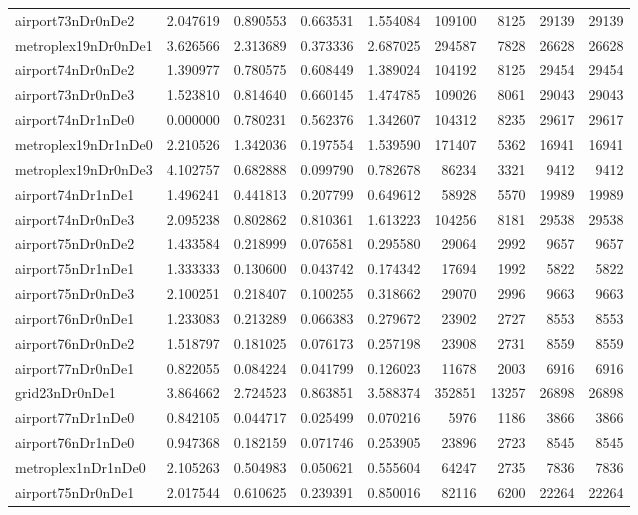 \begin{longtable}{|l|r|r|r|r|r|r|r|r|}
airport73nDr0nDe2 & 2.047619 & 0.890553 & 0.663531 & 1.554084 & 109100 & 8125 & 29139 & 29139 \\
metroplex19nDr0nDe1 & 3.626566 & 2.313689 & 0.373336 & 2.687025 & 294587 & 7828 & 26628 & 26628 \\
airport74nDr0nDe2 & 1.390977 & 0.780575 & 0.608449 & 1.389024 & 104192 & 8125 & 29454 & 29454 \\
airport73nDr0nDe3 & 1.523810 & 0.814640 & 0.660145 & 1.474785 & 109026 & 8061 & 29043 & 29043 \\
airport74nDr1nDe0 & 0.000000 & 0.780231 & 0.562376 & 1.342607 & 104312 & 8235 & 29617 & 29617 \\
metroplex19nDr1nDe0 & 2.210526 & 1.342036 & 0.197554 & 1.539590 & 171407 & 5362 & 16941 & 16941 \\
metroplex19nDr0nDe3 & 4.102757 & 0.682888 & 0.099790 & 0.782678 & 86234 & 3321 & 9412 & 9412 \\
airport74nDr1nDe1 & 1.496241 & 0.441813 & 0.207799 & 0.649612 & 58928 & 5570 & 19989 & 19989 \\
airport74nDr0nDe3 & 2.095238 & 0.802862 & 0.810361 & 1.613223 & 104256 & 8181 & 29538 & 29538 \\
airport75nDr0nDe2 & 1.433584 & 0.218999 & 0.076581 & 0.295580 & 29064 & 2992 & 9657 & 9657 \\
airport75nDr1nDe1 & 1.333333 & 0.130600 & 0.043742 & 0.174342 & 17694 & 1992 & 5822 & 5822 \\
airport75nDr0nDe3 & 2.100251 & 0.218407 & 0.100255 & 0.318662 & 29070 & 2996 & 9663 & 9663 \\
airport76nDr0nDe1 & 1.233083 & 0.213289 & 0.066383 & 0.279672 & 23902 & 2727 & 8553 & 8553 \\
airport76nDr0nDe2 & 1.518797 & 0.181025 & 0.076173 & 0.257198 & 23908 & 2731 & 8559 & 8559 \\
airport77nDr0nDe1 & 0.822055 & 0.084224 & 0.041799 & 0.126023 & 11678 & 2003 & 6916 & 6916 \\
grid23nDr0nDe1 & 3.864662 & 2.724523 & 0.863851 & 3.588374 & 352851 & 13257 & 26898 & 26898 \\
airport77nDr1nDe0 & 0.842105 & 0.044717 & 0.025499 & 0.070216 & 5976 & 1186 & 3866 & 3866 \\
airport76nDr1nDe0 & 0.947368 & 0.182159 & 0.071746 & 0.253905 & 23896 & 2723 & 8545 & 8545 \\
metroplex1nDr1nDe0 & 2.105263 & 0.504983 & 0.050621 & 0.555604 & 64247 & 2735 & 7836 & 7836 \\
airport75nDr0nDe1 & 2.017544 & 0.610625 & 0.239391 & 0.850016 & 82116 & 6200 & 22264 & 22264 \\

\end{longtable}
